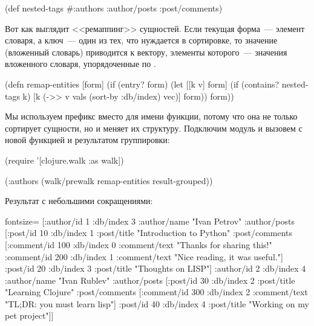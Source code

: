 \begin{english}
  \begin{clojure}
(def nested-tags
  #{:authors :author/posts :post/comments})
  \end{clojure}
\end{english}

Вот как выглядит <<ремаппинг>> сущностей. Если текущая форма~--- элемент словаря, а ключ~--- один из тех, что нуждается в сортировке, то значение (вложенный словарь) приводится к вектору, элементы которого~--- значения вложенного словаря, упорядоченные по .

\begin{english}
  \begin{clojure}
(defn remap-entities
  [form]
  (if (entry? form)
    (let [[k v] form]
      (if (contains? nested-tags k)
        [k (->> v vals (sort-by :db/index) vec)]
        form))
    form))
  \end{clojure}
\end{english}


Мы используем префикс  вместо  для имени функции, потому что она не только сортирует сущности, но и меняет их структуру. Подключим модуль  и вызовем  с новой функцией и результатом группировки:

\begin{english}
  \begin{clojure}
(require '[clojure.walk :as walk])

(:authors
 (walk/prewalk remap-entities result-grouped))
  \end{clojure}
\end{english}

Результат с небольшими сокращениями:

\begin{english}
  \begin{clojure*}{fontsize=\small}
[{:author/id 1
  :db/index 3
  :author/name "Ivan Petrov"
  :author/posts
  [{:post/id 10
    :db/index 1
    :post/title "Introduction to Python"
    :post/comments
    [{:comment/id 100
      :db/index 0
      :comment/text "Thanks for sharing this!"}
     {:comment/id 200
      :db/index 1
      :comment/text "Nice reading, it was useful."}]}
   {:post/id 20
    :db/index 3
    :post/title "Thoughts on LISP"}]}
 {:author/id 2
  :db/index 4
  :author/name "Ivan Rublev"
  :author/posts
  [{:post/id 30
    :db/index 2
    :post/title "Learning Clojure"
    :post/comments
    [{:comment/id 300
      :db/index 2
      :comment/text "TL;DR: you must learn lisp"}]}
   {:post/id 40
    :db/index 4
    :post/title "Working on my pet project"}]}]
  \end{clojure*}
\end{english}

